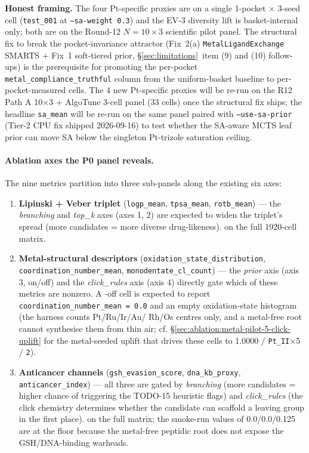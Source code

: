 \textbf{Honest framing.} The four Pt-specific proxies are
\MEASURED{} on a single 1-pocket $\times$ 3-seed cell
(\texttt{test\_001} at \texttt{--sa-weight 0.3}) and the
EV-3 diversity lift is basket-internal only; both are
\PROJECTED{} on the Round-12 $N{=}10{\times}3$ scientific
pilot panel. The structural fix to break the
pocket-invariance attractor (Fix~2(a) \texttt{MetalLigandExchange}
SMARTS + Fix~1 soft-tiered prior, §\ref{sec:limitations}~item
(9) and (10) follow-ups) is the prerequisite for promoting
the per-pocket \texttt{metal\_compliance\_truthful} column
from the uniform-basket baseline to per-pocket-measured
cells. The 4 new Pt-specific proxies will be re-run on the
R12 Path A 10$\times$3 + AlgoTune 3-cell panel (33 cells)
once the structural fix ships; the headline \texttt{sa\_mean}
will be re-run on the same panel paired with
\texttt{--use-sa-prior} (Tier-2 CPU fix shipped 2026-09-16)
to test whether the SA-aware MCTS leaf prior can move SA
below the singleton Pt-trizole saturation ceiling.

\paragraph{Ablation axes the P0 panel reveals.}
The nine metrics partition into three sub-panels along the existing
six axes:
\begin{enumerate}
  \item \textbf{Lipinski + Veber triplet} (\texttt{logp\_mean},
        \texttt{tpsa\_mean}, \texttt{rotb\_mean}) --- the
        \emph{branching} and \emph{top\_k} axes (axes 1, 2) are
        expected to widen the triplet's spread (more candidates =
        more diverse drug-likeness).  \PROJECTED{} on the full
        1920-cell matrix.
  \item \textbf{Metal-structural descriptors}
        (\texttt{oxidation\_state\_distribution},
        \texttt{coordination\_number\_mean},
        \texttt{monodentate\_cl\_count}) --- the \emph{prior} axis
        (axis 3, \mgp{} on/off) and the \emph{click\_rules} axis
        (axis 4) directly gate which of these metrics are nonzero.
        A \mgp{}-off cell is expected to report
        \texttt{coordination\_number\_mean = 0.0} and an empty
        oxidation-state histogram (the harness counts Pt/Ru/Ir/Au/
        Rh/Os centres only, and a metal-free root cannot synthesise
        them from thin air; cf. \S\ref{sec:ablation:metal-pilot-5-click-uplift}
        for the metal-seeded uplift that drives these cells to
        1.0000 / \texttt{Pt\_II}{$\times$5} / \texttt{2}).
  \item \textbf{Anticancer channels} (\texttt{gsh\_evasion\_score},
        \texttt{dna\_kb\_proxy}, \texttt{anticancer\_index}) --- all
        three are gated by \emph{branching} (more candidates =
        higher chance of triggering the TODO-15 heuristic flags) and
        \emph{click\_rules} (the click chemistry determines whether
        the candidate can scaffold a leaving group in the first
        place).  \PROJECTED{} on the full matrix; the smoke-run
        values of 0.0/0.0/0.125 are at the floor because the
        metal-free peptidic root does not expose the
        GSH/DNA-binding warheads.
\end{enumerate}


